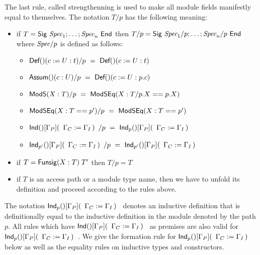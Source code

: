 The last rule, called strengthenning is used to make all module fields
manifestly equal to themselves. The notation $T/p$ has the following
meaning:
\begin{itemize}
\item if $T=\sig{\Spec_1;\dots;\Spec_n}$ then
  $T/p=\sig{\Spec_1/p;\dots;\Spec_n/p}$ where $\Spec/p$ is defined as
  follows:
  \begin{itemize}
  \item $\Def{}{c}{U}{t}/p ~=~ \Def{}{c}{U}{t}$
  \item $\Assum{}{c}{U}/p ~=~ \Def{}{c}{U}{p.c}$
  \item $\ModS{X}{T}/p ~=~ \ModSEq{X}{T/p.X}{p.X}$
  \item $\ModSEq{X}{T}{p'}/p ~=~ \ModSEq{X}{T}{p'}$
  \item $\Ind{}{\Gamma_P}{\Gamma_C}{\Gamma_I}/p ~=~ \Indp{}{\Gamma_P}{\Gamma_C}{\Gamma_I}{p}$
  \item $\Indp{}{\Gamma_P}{\Gamma_C}{\Gamma_I}{p'}/p ~=~ \Indp{}{\Gamma_P}{\Gamma_C}{\Gamma_I}{p'}$
  \end{itemize}
\item if $T=\funsig{X}{T}{T'}$ then $T/p=T$
\item if $T$ is an access path or a module type name, then we have to
  unfold its definition and proceed according to the rules above. 
\end{itemize}
The notation $\Indp{}{\Gamma_P}{\Gamma_C}{\Gamma_I}{p}$ denotes an
inductive definition that is definitionally equal to the inductive
definition in the module denoted by the path $p$. All rules which have
$\Ind{}{\Gamma_P}{\Gamma_C}{\Gamma_I}$ as premises are also valid for 
$\Indp{}{\Gamma_P}{\Gamma_C}{\Gamma_I}{p}$. We give the formation rule
for $\Indp{}{\Gamma_P}{\Gamma_C}{\Gamma_I}{p}$ below as well as
the equality rules on inductive types and constructors. 


